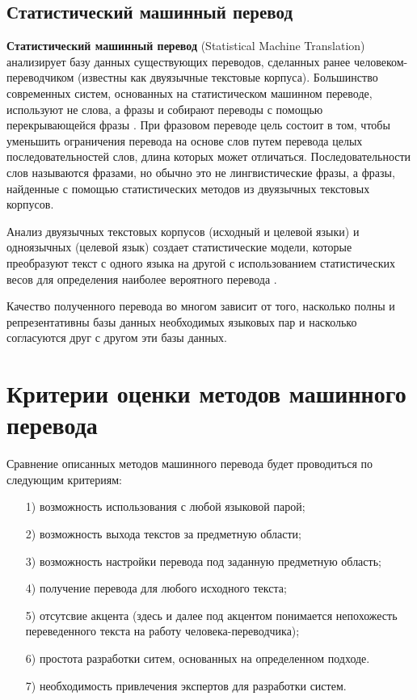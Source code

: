 \subsection{Статистический машинный перевод}

\textbf{Статистический машинный перевод} (Statistical Machine Translation) анализирует базу данных существующих переводов, сделанных ранее человеком-переводчиком (известны как двуязычные текстовые корпуса). 
Большинство современных систем, основанных на статистическом машинном переводе, используют не слова, а фразы и собирают переводы с помощью перекрывающейся фразы \cite{english}. 
При фразовом переводе цель состоит в том, чтобы уменьшить ограничения перевода на основе слов путем перевода целых последовательностей слов, длина которых может отличаться. 
Последовательности слов называются фразами, но обычно это не лингвистические фразы, а фразы, найденные с помощью статистических методов из двуязычных текстовых корпусов. 

Анализ двуязычных текстовых корпусов (исходный и целевой языки) и одноязычных (целевой язык) создает статистические модели, которые преобразуют текст с одного языка на другой с использованием статистических весов для определения наиболее вероятного перевода \cite{rarenko}.

Качество полученного перевода во многом зависит от того, насколько полны и репрезентативны базы данных необходимых языковых пар и насколько согласуются друг с другом эти базы данных.

\section{Критерии оценки методов машинного перевода}

Сравнение описанных методов машинного перевода будет проводиться по следующим критериям:

\begin{enumerate}
    \item[1)] возможность использования с любой языковой парой;
    \item[2)] возможность выхода текстов за предметную области;
    \item[3)] возможность настройки перевода под заданную предметную область;
    \item[4)] получение перевода для любого исходного текста;
    \item[5)] отсутсвие акцента (здесь и далее под акцентом понимается непохожесть переведенного текста на работу человека-переводчика);
    \item[6)] простота разработки ситем, основанных на определенном подходе.
    \item[7)] необходимость привлечения экспертов для разработки систем.
\end{enumerate}


